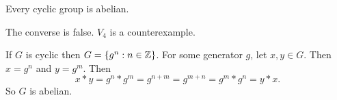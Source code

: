 \documentclass[class=article,crop=false]{standalone}
\begin{document}
\begin{thm}[]
	Every cyclic group is abelian.
\end{thm}
\begin{note}[]
The converse is false. $ V_4$ is a counterexample.
\end{note}

\begin{prf}
If $ G$ is cyclic then $ G=\left\{ g^{n}:n \in \mathbb{Z} \right\} $. For some generator $ g$, let  $ x,y \in G$. Then $ x=g^{n}$ and $ y=g^{m}$. Then
\[
	x*y = g^{n} * g^{m} = g^{n+m} = g^{m+n} = g^{m} * g^{n} = y*x
.\]
So $ G$ is abelian.
\end{prf}
\end{document}
